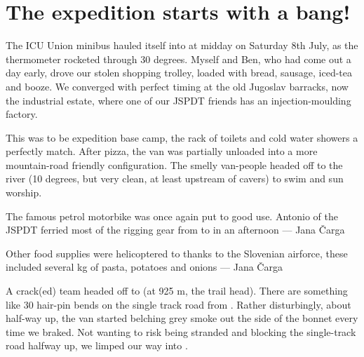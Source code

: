 \section{The expedition starts with a bang!}
The ICU Union minibus hauled itself into  at midday on Saturday 8th July, as the thermometer rocketed through 30 degrees. Myself and Ben, who had come out a day early, drove our stolen shopping trolley, loaded with bread, sausage, iced-tea and booze. We converged with perfect timing at the old Jugoslav barracks, now the industrial estate, where one of our JSPDT friends has an injection-moulding factory. 

This was to be expedition base camp, the rack of toilets and cold water showers a perfectly match. After pizza, the van was partially unloaded into a more mountain-road friendly configuration. The smelly van-people headed off to the  river (10 degrees, but very clean, at least upstream of cavers) to swim and sun worship. 

\begin{marginfigure}
\checkoddpage \ifoddpage \forcerectofloat \else \forceversofloat \fi
\centering
{}
\caption{The famous petrol motorbike was once again put to good use. Antonio of the JSPDT ferried most of the rigging gear from \protect{} to \protect{} in an afternoon --- Jana \v{C}arga}
\label{motorbike}
\end{marginfigure}

\begin{marginfigure}
\checkoddpage \ifoddpage \forcerectofloat \else \forceversofloat \fi
\centering
{}
\caption{Other food supplies were helicoptered to \protect{} thanks to the Slovenian airforce, these included several kg of pasta, potatoes and onions --- Jana \v{C}arga}
\label{helicopter fratnik}
\end{marginfigure}

A crack(ed) team headed off to  (at 925 m, the trail head). There are something like 30 hair-pin bends on the single track road from . Rather disturbingly, about half-way up, the van started belching  grey smoke out the side of the bonnet every time we braked. Not wanting to risk being stranded and blocking the single-track road halfway up, we limped our way into . 

